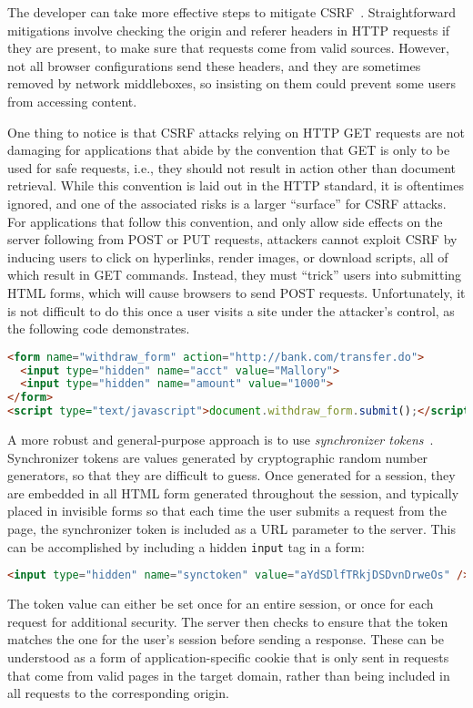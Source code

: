 \documentclass[11pt,twoside]{scrartcl}
\begin{document}
The developer can take more effective steps to mitigate CSRF~\cite{csrfmitigation}. Straightforward mitigations involve checking the origin and referer headers in HTTP requests if they are present, to make sure that requests come from valid sources. 
However, not all browser configurations send these headers, and they are sometimes removed by network middleboxes, so insisting on them could prevent some users from accessing content.

One thing to notice is that CSRF attacks relying on HTTP GET requests are not damaging for applications that abide by the convention that GET is only to be used for safe requests, i.e., they should not result in action other than document retrieval.
While this convention is laid out in the HTTP standard, it is oftentimes ignored, and one of the associated risks is a larger ``surface'' for CSRF attacks.
For applications that follow this convention, and only allow side effects on the server following from POST or PUT requests, attackers cannot exploit CSRF by inducing users to click on hyperlinks, render images, or download scripts, all of which result in GET commands.
Instead, they must ``trick'' users into submitting HTML forms, which will cause browsers to send POST requests.
Unfortunately, it is not difficult to do this once a user visits a site under the attacker's control, as the following code demonstrates.
\begin{lstlisting}[language=HTML]
<form name="withdraw_form" action="http://bank.com/transfer.do">
  <input type="hidden" name="acct" value="Mallory">
  <input type="hidden" name="amount" value="1000">
</form>
<script type="text/javascript">document.withdraw_form.submit();</script>
\end{lstlisting}

A more robust and general-purpose approach is to use \emph{synchronizer tokens}~\cite{csrfmitigation}. 
Synchronizer tokens are values generated by cryptographic random number generators, so that they are difficult to guess. 
Once generated for a session, they are embedded in all HTML form generated throughout the session, and typically placed in invisible forms so that each time the user submits a request from the page, the synchronizer token is included as a URL parameter to the server. 
This can be accomplished by including a hidden \verb'input' tag in a form:
\begin{lstlisting}[language=HTML]
<input type="hidden" name="synctoken" value="aYdSDlfTRkjDSDvnDrweOs" />
\end{lstlisting}
The token value can either be set once for an entire session, or once for each request for additional security.
The server then checks to ensure that the token matches the one for the user's session before sending a response. 
These can be understood as a form of application-specific cookie that is only sent in requests that come from valid pages in the target domain, rather than being included in all requests to the corresponding origin.


\end{document}
